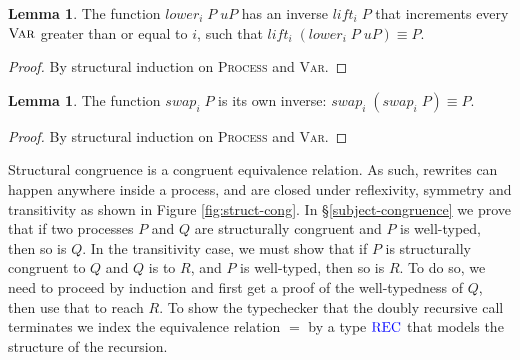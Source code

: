\documentclass[a4paper,UKenglish,cleveref, autoref, thm-restate,authorcolumns]{lipics-v2019}
\theoremstyle{definition}
\newtheorem{nilemma}[theorem]{Lemma}
\newcommand{\type}[1]{\textcolor{blue}{\operatorname{#1}}}
\newcommand{\Rec}{\type{REC}}
\begin{document}
\begin{nilemma}
  \label{lm:lower-lift}
  The function $lower_i \; P \; uP$ has an inverse $lift_i \; P$ that increments every $\textsc{Var}$ greater than or equal to $i$, such that $lift_i \; (lower_i \; P \; uP) \equiv P$.
\end{nilemma}
\begin{proof}
  By structural induction on \textsc{Process} and \textsc{Var}.
\end{proof}
  
\begin{nilemma}
  \label{lm:swap-swap}
  The function $swap_i \; P$ is its own inverse: $swap_i \; (swap_i \; P) \equiv P$.
\end{nilemma}
\begin{proof}
  By structural induction on \textsc{Process} and \textsc{Var}.
\end{proof}

Structural congruence is a congruent equivalence relation.
As such, rewrites can happen anywhere inside a process, and are closed under reflexivity, symmetry and transitivity as shown in Figure \ref{fig:struct-cong}.
In \S \ref{subject-congruence} we prove that if two processes $P$ and $Q$ are structurally congruent and $P$ is well-typed, then so is $Q$.
In the transitivity case, we must show that if $P$ is structurally congruent to $Q$ and $Q$ is to $R$, and $P$ is well-typed, then so is $R$.
To do so, we need to proceed by induction and first get a proof of the well-typedness of $Q$, then use that to reach $R$.
To show the typechecker that the doubly recursive call terminates we index the equivalence relation $=$ by a type $\Rec$ that models the structure of the recursion.
\end{document}
